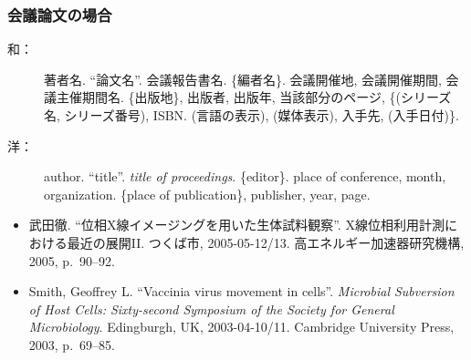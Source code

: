 		\subsubsection{会議論文の場合}

			\begin{description}
				\item[和：] 著者名. ``論文名''. 会議報告書名. \{編者名\}. 会議開催地, 会議開催期間, 会議主催期間名. \{出版地\}, 出版者, 出版年, 当該部分のページ, \{(シリーズ名, シリーズ番号), ISBN. (言語の表示), (媒体表示), 入手先, (入手日付)\}.
				\item[洋：] author. ``title''. \textit{title of proceedings}. \{editor\}. place of conference, month, organization. \{place of publication\}, publisher, year, page.
			\end{description}

			\begin{screen} \begin{itemize}
				\item 武田徹. ``位相X線イメージングを用いた生体試料観察''. X線位相利用計測における最近の展開II. つくば市, 2005-05-12/13. 高エネルギー加速器研究機構, 2005, p.~90--92.

				\item Smith, Geoffrey L. ``Vaccinia virus movement in cells''. \textit{Microbial Subversion of Host Cells: Sixty-second Symposium of the Society for General Microbiology}. Edingburgh, UK, 2003-04-10/11. Cambridge University Press, 2003, p.~69--85.
			\end{itemize} \end{screen}

